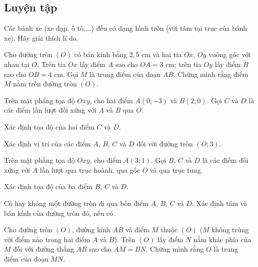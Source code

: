 \begin{practice}
    \subsection{Luyện tập}

    \begin{questions}[series=SBT]
        \item Các bánh xe (xe đạp, ô tô,...) đều có dạng hình tròn (với tâm tại trục của bánh xe). Hãy giải thích lí do.

        \answerline
        \answerline

        \item Cho đường tròn $(O)$ có bán kính bằng $2{,}5$ cm và hai tia $Ox$, $Oy$ vuông góc với nhau tại $O$. Trên tia $Ox$ lấy điểm $A$ sao cho $OA=3$ cm; trên tia $Oy$ lấy điểm $B$ sao cho $OB=4$ cm. Gọi $M$ là trung điểm của đoạn $AB$. Chứng minh rằng điểm $M$ nằm trên đường tròn $(O)$.

        \answerline
        \answerline
        \answerline

        \item Trên mặt phẳng tọa độ $Oxy$, cho hai điểm $A(0;-3)$ và $B(2;0)$. Gọi $C$ và $D$ là các điểm lần lượt đối xứng với $A$ và $B$ qua $O$.
        \begin{questions}
            \item Xác định tọa độ của hai điểm $C$ và $D$.

            \answerline
            \item Xác định vị trí của các điểm $A$, $B$, $C$ và $D$ đối với đường tròn $(O;3)$.

            \answerline
            \answerline
        \end{questions}

        \item Trên mặt phẳng tọa độ $Oxy$, cho điểm $A(3;1)$. Gọi $B$, $C$ và $D$ là các điểm đối xứng với $A$ lần lượt qua trục hoành, qua gốc $O$ và qua trục tung.
        \begin{questions}
            \item Xác định tọa độ của ba điểm $B$, $C$ và $D$.

            \answerline
            \item Có hay không một đường tròn đi qua bốn điểm $A$, $B$, $C$ và $D$. Xác định tâm và bán kính của đường tròn đó, nếu có.

            \answerline
            \answerline
        \end{questions}

        \item Cho đường tròn $(O)$, đường kính $AB$ và điểm $M$ thuộc $(O)$ ($M$ không trùng với điểm nào trong hai điểm $A$ và $B$). Trên $(O)$ lấy điểm $N$ nằm khác phía của $M$ đối với đường thẳng $AB$ sao cho $AM=BN$. Chứng minh rằng $O$ là trung điểm của đoạn $MN$.

        \answerline
        \answerline
        \answerline
    \end{questions}
\end{practice}
